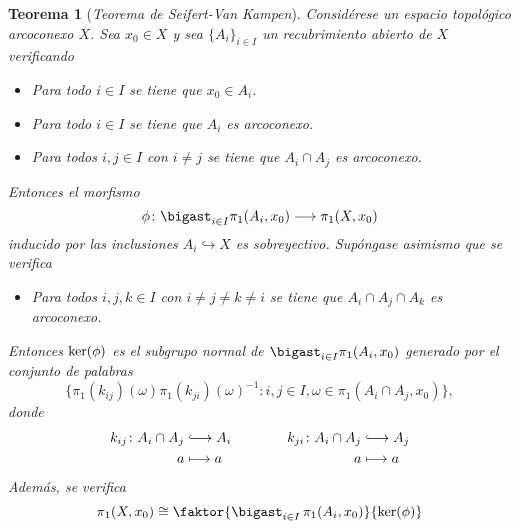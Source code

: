 \documentclass[11pt]{report}
\newenvironment{ctheorem} %
  {\begin{mdframed}[innertopmargin = 0pt,
                    innerbottommargin = 7.5pt,
                    backgroundcolor = lightgray!10,
                    linewidth = 1pt,
                    shadow = true,
                    shadowsize = 5pt,
                    roundcorner = 0pt,
                    skipabove = 0pt]
    \begin{theorem}}
  {\end{theorem}\end{mdframed}}
\newtheorem{theorem}{Teorema}[chapter]
\theoremstyle{definition}
\theoremstyle{definition}
\theoremstyle{remark}
\begin{document}
\begin{ctheorem}[\textit{Teorema de Seifert-Van Kampen}]
Considérese un espacio topológico arcoconexo $X$. Sea $x_0 \in X$ y sea $\{A_i\}_{i \in I}$ un recubrimiento abierto de $X$ verificando
\begin{itemize}
    \item[(i)] Para todo $i \in I$ se tiene que $x_0 \in A_i$.
    \item[(ii)] Para todo $i \in I$ se tiene que $A_i$ es arcoconexo.
    \item[(iii)] Para todos $i,j \in I$ con $i \neq j$ se tiene que $A_i \cap A_j$ es arcoconexo.
\end{itemize}
Entonces el morfismo
\[\phi \colon \bigast_{i \in I}\pi_1(A_i, x_0) \longrightarrow \pi_1(X,x_0)\]
inducido por las inclusiones $A_i \hookrightarrow X$ es sobreyectivo. Supóngase asimismo que se verifica
\begin{itemize}
    \item[(iv)] Para todos $i,j,k \in I$ con $i \neq j \neq k \neq i$ se tiene que $A_i \cap A_j \cap A_k$ es arcoconexo.
\end{itemize}
Entonces $\textup{ker}(\phi)$ es el subgrupo normal de $\bigast_{i \in I} \pi_1(A_i,x_0)$ generado por el conjunto de palabras \[\{\pi_1(k_{ij})(\omega) \pi_1(k_{ji})(\omega)^{-1} \colon i,j \in I, \omega \in \pi_1(A_i \cap A_j,x_0)\},\]
donde
\[
\begin{aligned}[t]
k_{ij} \colon A_i \cap A_j &\lhook\joinrel\longrightarrow A_i \\
a &\longmapsto a
\end{aligned} \qquad \qquad
\begin{aligned}[t]
k_{ji} \colon A_i \cap A_j &\lhook\joinrel\longrightarrow A_j \\
a &\longmapsto a
\end{aligned}
\]
Además, se verifica
\[\pi_1(X,x_0) \cong \faktor{\textstyle{\bigast_{i \in I}} \, \pi_1(A_i,x_0)}{\textup{ker}(\phi)}\]
\end{ctheorem}
\end{document}
